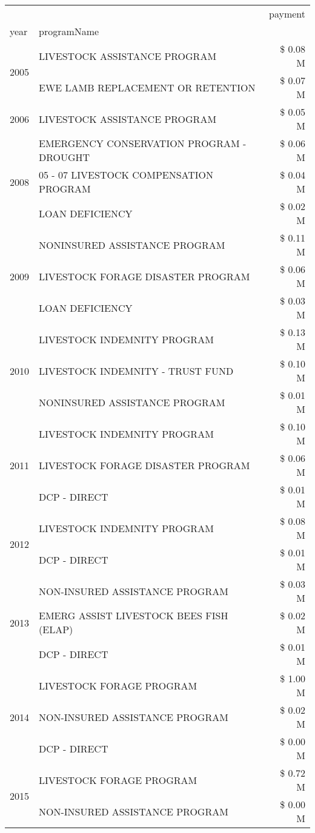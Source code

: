 \begin{tabular}{llr}
\toprule
 &  & payment \\
year & programName &  \\
\midrule
\multirow[t]{2}{*}{2005} & LIVESTOCK ASSISTANCE PROGRAM & \$ 0.08 M \\
 & EWE LAMB REPLACEMENT OR RETENTION & \$ 0.07 M \\
\cline{1-3}
2006 & LIVESTOCK ASSISTANCE PROGRAM & \$ 0.05 M \\
\cline{1-3}
\multirow[t]{3}{*}{2008} & EMERGENCY CONSERVATION PROGRAM - DROUGHT & \$ 0.06 M \\
 & 05 - 07 LIVESTOCK COMPENSATION PROGRAM & \$ 0.04 M \\
 & LOAN DEFICIENCY & \$ 0.02 M \\
\cline{1-3}
\multirow[t]{3}{*}{2009} & NONINSURED ASSISTANCE PROGRAM & \$ 0.11 M \\
 & LIVESTOCK FORAGE DISASTER  PROGRAM & \$ 0.06 M \\
 & LOAN DEFICIENCY & \$ 0.03 M \\
\cline{1-3}
\multirow[t]{3}{*}{2010} & LIVESTOCK INDEMNITY PROGRAM & \$ 0.13 M \\
 & LIVESTOCK INDEMNITY - TRUST FUND & \$ 0.10 M \\
 & NONINSURED ASSISTANCE PROGRAM & \$ 0.01 M \\
\cline{1-3}
\multirow[t]{3}{*}{2011} & LIVESTOCK INDEMNITY PROGRAM & \$ 0.10 M \\
 & LIVESTOCK FORAGE DISASTER PROGRAM & \$ 0.06 M \\
 & DCP - DIRECT & \$ 0.01 M \\
\cline{1-3}
\multirow[t]{2}{*}{2012} & LIVESTOCK INDEMNITY PROGRAM & \$ 0.08 M \\
 & DCP - DIRECT & \$ 0.01 M \\
\cline{1-3}
\multirow[t]{3}{*}{2013} & NON-INSURED ASSISTANCE PROGRAM & \$ 0.03 M \\
 & EMERG ASSIST LIVESTOCK BEES FISH (ELAP) & \$ 0.02 M \\
 & DCP - DIRECT & \$ 0.01 M \\
\cline{1-3}
\multirow[t]{3}{*}{2014} & LIVESTOCK FORAGE PROGRAM & \$ 1.00 M \\
 & NON-INSURED ASSISTANCE PROGRAM & \$ 0.02 M \\
 & DCP - DIRECT & \$ 0.00 M \\
\cline{1-3}
\multirow[t]{2}{*}{2015} & LIVESTOCK FORAGE PROGRAM & \$ 0.72 M \\
 & NON-INSURED ASSISTANCE PROGRAM & \$ 0.00 M \\

\end{tabular}
